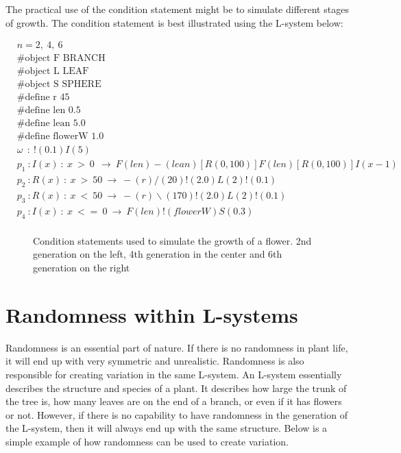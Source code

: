 \noindent
The practical use of the condition statement might be to simulate different stages of growth. The condition statement is best illustrated using the L-system below: 

\begin{equation} \label{conditional l-system example}
\begin{aligned}
	&n=2,~4,~6 \\
	&\#\text{object F BRANCH} \\
 	&\#\text{object L LEAF} \\
	&\#\text{object S SPHERE} \\
	&\#\text{define r 45} \\
	&\#\text{define len 0.5} \\
	&\#\text{define lean 5.0} \\
	&\#\text{define flowerW 1.0} \\
	&\omega~~ :~ !(0.1)I(5)\\
	&p_1~ :  I(x)~ :~ x~ >~ 0~~ \rightarrow~ F(len)-(lean)[R({0, 100})]F(len)[R({0, 100})]I(x-1)\\
	&p_2~ :  R(x)~ :~ x~ >~ 50~ \rightarrow~ -(r)/(20)!(2.0)L(2)!(0.1)\\
	&p_3~ :  R(x)~ :~ x~ <~ 50~ \rightarrow~ -(r)\backslash(170)!(2.0)L(2)!(0.1)\\
	&p_4~ :  I(x)~ :~ x~ <=~ 0~ \rightarrow~ F(len)!(flowerW)S(0.3)\\
\end{aligned}
\end{equation}

\begin{figure}[htbp]
	{\centering
		\vspace{7px}
		\setlength{\fboxrule}{1pt}
		\caption{Condition statements used to simulate the growth of a flower. 2nd generation on the left, 4th generation in the center and 6th generation on the right}
	}
\end{figure}
\FloatBarrier

\section{Randomness within L-systems} \label{Randomness L-system Subsection}

Randomness is an essential part of nature. If there is no randomness in plant life, it will end up with very symmetric and unrealistic. Randomness is also responsible for creating variation in the same L-system. An L-system essentially describes the structure and species of a plant. It describes how large the trunk of the tree is, how many leaves are on the end of a branch, or even if it has flowers or not. However, if there is no capability to have randomness in the generation of the L-system, then it will always end up with the same structure. 
\vspace{5mm}
Below is a simple example of how randomness can be used to create variation.

